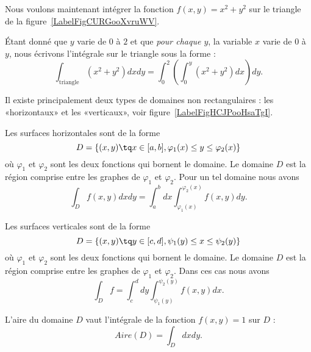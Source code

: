 Nous voulons maintenant intégrer la fonction \( f(x,y)=x^2+y^2\) sur le triangle de la figure~\ref{LabelFigCURGooXvruWV}. %
\newcommand{\CaptionFigCURGooXvruWV}{Intégration sur un triangle}


Étant donné que \( y\) varie de \( 0\) à \( 2\) et que \emph{pour chaque \( y\)}, la variable \( x\) varie de \( 0\) à \( y\), nous écrivons l'intégrale sur le triangle sous la forme :
\begin{equation}
	\int_{\text{triangle}}(x^2+y^2)dx dy=\int_0^2\left( \int_0^y(x^2+y^2)dx \right)dy.
\end{equation}

Il existe principalement deux types de domaines non rectangulaires : les «horizontaux» et les «verticaux», voir figure~\ref{LabelFigHCJPooHsaTgI}. %
\newcommand{\CaptionFigHCJPooHsaTgI}{Deux types de surfaces. Nous avons tracé un rectangle qui contient chacune des deux surfaces. L'intégrale sur un domaine sera l'intégrale sur le rectangle de la fonction qui vaut zéro en dehors du domaine.}


Les surfaces horizontales sont de la forme
\begin{equation}
	D=\{ (x,y)\tq x\in\mathopen[ a , b \mathclose],\varphi_1(x)\leq y\leq \varphi_2(x) \}
\end{equation}
où \( \varphi_1\) et \( \varphi_2\) sont les deux fonctions qui bornent le domaine. Le domaine \( D\) est la région comprise entre les graphes de \( \varphi_1\) et \( \varphi_2\). Pour un tel domaine nous avons
\begin{equation}
	\int_Df(x,y)dxdy=\int_a^bdx\int_{\varphi_1(x)}^{\varphi_2(x)}f(x,y)dy.
\end{equation}

Les surfaces verticales sont de la forme
\begin{equation}
	D=\{ (x,y)\tq y\in\mathopen[ c , d \mathclose],\psi_1(y)\leq x\leq \psi_2(y) \}
\end{equation}
où \( \varphi_1\) et \( \varphi_2\) sont les deux fonctions qui bornent le domaine. Le domaine \( D\) est la région comprise entre les graphes de \( \varphi_1\) et \( \varphi_2\). Dans ces cas nous avons
\begin{equation}
	\int_Df=\int_c^d dy\int_{\psi_1(y)}^{\psi_2(y)} f(x,y)dx.
\end{equation}

\begin{proposition}
	L'aire du domaine \( D\) vaut l'intégrale de la fonction \( f(x,y)=1\) sur \( D\) :
	\begin{equation}
		Aire(D)=\int_Ddxdy.
	\end{equation}
\end{proposition}


